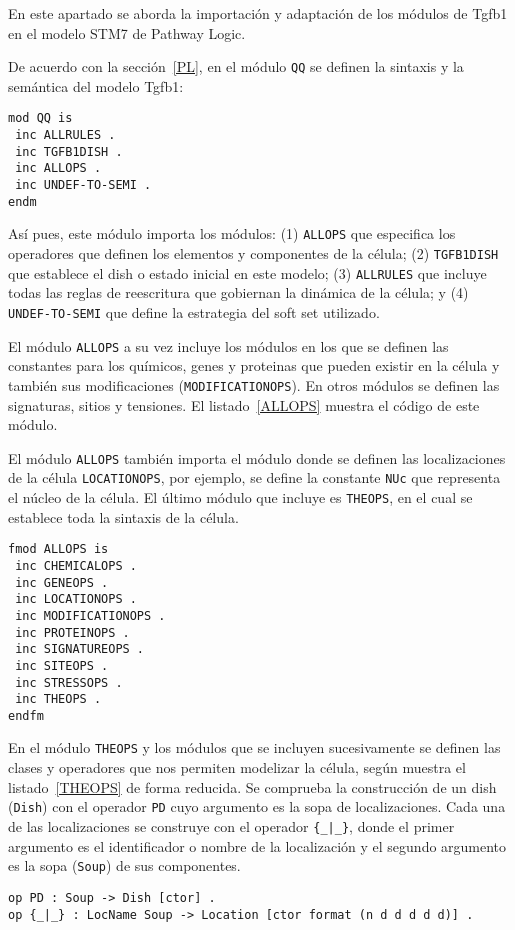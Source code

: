 En este apartado se aborda la importación y adaptación de los módulos de Tgfb1 en el modelo STM7 de Pathway Logic.

De acuerdo con la sección~\ref{PL}, en el módulo \texttt{QQ} se definen la sintaxis y la semántica del modelo Tgfb1:

\begin{lstlisting}[language=Maude,caption={Módulo \texttt{QQ}}]
mod QQ is
 inc ALLRULES .
 inc TGFB1DISH .
 inc ALLOPS .
 inc UNDEF-TO-SEMI .
endm
\end{lstlisting}

\noindent
Así pues, este módulo importa los módulos: (1) \texttt{ALLOPS} que especifica los operadores que definen los elementos y componentes de la célula; (2) \texttt{TGFB1DISH}  que establece el dish o estado inicial en este modelo;
(3) \texttt{ALLRULES} que incluye todas las reglas de reescritura que gobiernan la dinámica de la célula; y 
(4) \texttt{UNDEF-TO-SEMI} que define la estrategia del soft set utilizado.
\bigskip

El módulo \texttt{ALLOPS} a su vez incluye los módulos en los que se definen las constantes para los químicos, genes y proteinas que pueden existir en la célula y también sus modificaciones (\texttt{MODIFICATIONOPS}). En otros módulos se definen las signaturas, sitios y tensiones. El listado~\ref{ALLOPS} muestra el código de este módulo.

El módulo \texttt{ALLOPS} también importa el módulo donde se definen las localizaciones de la célula \texttt{LOCATIONOPS}, por ejemplo, se define la constante \texttt{NUc} que representa el núcleo de la célula.
El último módulo que incluye es \texttt{THEOPS}, en el cual se establece toda la sintaxis de la célula.

\begin{lstlisting}[label=ALLOPS,language=Maude,caption={Módulo \texttt{ALLOPS}}]
fmod ALLOPS is
 inc CHEMICALOPS .
 inc GENEOPS .
 inc LOCATIONOPS .
 inc MODIFICATIONOPS .
 inc PROTEINOPS .
 inc SIGNATUREOPS .
 inc SITEOPS .
 inc STRESSOPS .
 inc THEOPS .
endfm
\end{lstlisting}

En el módulo \texttt{THEOPS} y los módulos que se incluyen sucesivamente se definen las clases y operadores que nos permiten modelizar la célula, según muestra el listado~\ref{THEOPS} de forma reducida.
Se comprueba la construcción de un dish (\texttt{Dish}) con el operador \texttt{PD} cuyo argumento es la sopa de localizaciones. Cada una de las localizaciones se construye con el operador \verb${_|_}$, donde el primer argumento es el identificador o nombre de la localización y el segundo argumento es la sopa (\texttt{Soup}) de sus componentes.
\begin{lstlisting}[language=Maude]
op PD : Soup -> Dish [ctor] .
op {_|_} : LocName Soup -> Location [ctor format (n d d d d d)] .
\end{lstlisting}

